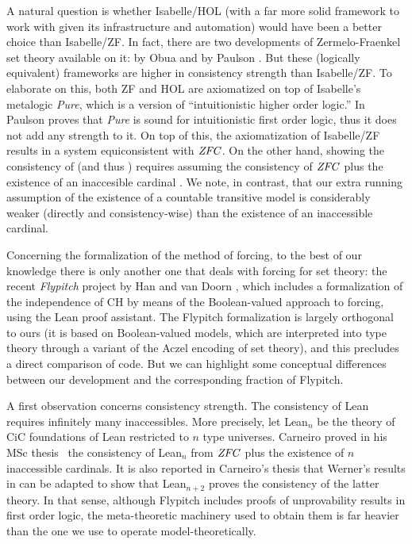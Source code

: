 A natural question is whether Isabelle/HOL (with a far more solid
framework to work with given its infrastructure and automation) would
have been a better choice than Isabelle/ZF. In fact,
there are two developments of Zermelo-Fraenkel set theory available on
it:  by Obua \cite{DBLP:conf/ictac/Obua06} and
 by Paulson
\cite{ZFC_in_HOL-AFP}. But these (logically equivalent) frameworks are
higher in consistency strength than Isabelle/ZF. To elaborate on this,
both ZF and HOL are axiomatized on top of Isabelle's metalogic
\emph{Pure}, which is a version of ``intuitionistic higher order
logic.'' In  \cite{Paulson1989} Paulson proves that \emph{Pure}
is sound for intuitionistic first order logic, thus it does not add
any strength to it. On top of this, the axiomatization of Isabelle/ZF
results in a system equiconsistent with $\mathit{ZFC}$. On the other hand,
showing the consistency of  (and thus
) requires
assuming the consistency of $\mathit{ZFC}$ plus the existence of an
inaccesible cardinal \cite[Sect.~3]{DBLP:conf/ictac/Obua06}. We note,
in contrast, that our extra running assumption of the existence of a
countable transitive model is considerably weaker (directly and
consistency-wise) than the existence of an inaccessible cardinal.

Concerning the formalization of the method of forcing, to the best of
our knowledge there is only another one that deals with forcing for
set theory: the recent \emph{Flypitch} project by Han and van Doorn
\cite{han_et_al:LIPIcs:2019:11074,DBLP:conf/cpp/HanD20}, which
includes a formalization of the independence of CH by means of the
Boolean-valued approach to forcing, using the Lean proof
assistant. The Flypitch formalization is largely orthogonal to ours
(it is based on Boolean-valued models, which are interpreted into
type theory through a variant of the Aczel encoding of set theory),
and this precludes a direct comparison of code. But we can highlight
some conceptual differences between our development and the
corresponding fraction of Flypitch.


A first observation concerns consistency strength. The consistency of
Lean requires infinitely many inaccessibles. More precisely, let
Lean$_n$ be the theory of CiC foundations of Lean restricted to $n$
type universes.  Carneiro proved in his MSc thesis~\cite{carneiro-ms-thesis} the consistency of Lean$_n$ from $\mathit{ZFC}$ plus
the existence of $n$ inaccessible cardinals. It is also reported in
Carneiro's thesis that Werner's results in
\cite{10.5555/645869.668660} can be adapted to show that Lean$_{n+2}$
proves the consistency of the latter theory.  In that sense, although
Flypitch includes proofs of unprovability results in first order
logic, the meta-theoretic machinery used to obtain them is far heavier
than the one we use to operate model-theoretically.

